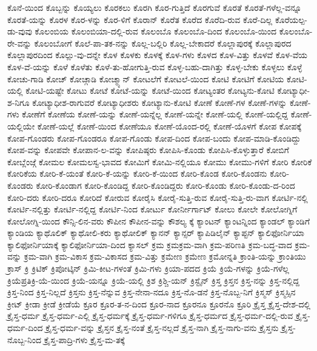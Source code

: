 {ಕೊನೆ-ಯಿಂದ
ಕೊಬ್ಬನ್ನು
ಕೊಯ್ಯಲು
ಕೊರಕಲು
ಕೊರಗಿ
ಕೊರ-ಗುತ್ತಿದೆ
ಕೊರಗುವೆ
ಕೊರತೆ
ಕೊರತೆ-ಗಳೆಲ್ಲ-ವನ್ನೂ
ಕೊರತೆ-ಯನ್ನು
ಕೊರಳ
ಕೊರ-ಳನ್ನು
ಕೊರ-ಳಿಗೆ
ಕೊರಾನ್
ಕೊರೆತ
ಕೊರೆದ
ಕೊರೆದಿ-ರುವ
ಕೊರೆ-ದಿಲ್ಲ
ಕೊರೆಯಲ್ಪ-ಡು-ವುವು
ಕೊಲಂಬಿಯ
ಕೊಲಂಬಿಯಾ-ದಲ್ಲಿ-ರುವ
ಕೊಲಂಬೊ
ಕೊಲಂಬೊ-ದಿಂದ
ಕೊಲಂಬೊ-ಯಿಂದ
ಕೊಲಂಬೊ-ರೇ-ವನ್ನು
ಕೊಲಂಬೋಗೆ
ಕೊಲೆ-ಪಾ-ತಕ-ನನ್ನು
ಕೊಲ್ಲ-ಬಲ್ಲಿರಿ
ಕೊಲ್ಲ-ಬೇಕಾದರೆ
ಕೊಲ್ಲಾಪುರಕ್ಕೆ
ಕೊಲ್ಲಾಪುರದ
ಕೊಲ್ಲಾಪುರದಿಂದ
ಕೊಲ್ಲು-ವು-ದನ್ನೇ
ಕೊಳ
ಕೊಳಕು
ಕೊಳಕ್ಕೆ
ಕೊಳ-ಗಳು
ಕೊಳದ
ಕೊಳ-ವಿತ್ತು
ಕೊಳವೆ
ಕೊಳ-ವೆಯ
ಕೊಳ-ವೆ-ಯನ್ನು
ಕೊಳೆ
ಕೊಳೆತು
ಕೊಳೆ-ತು-ಹೋಗುತ್ತಿ-ರುವ
ಕೊಳ್ಳ-ಬಹು-ದಾಗಿತ್ತು
ಕೊಳ್ಳ-ಬೇಕು
ಕೊಳ್ಳಲು
ಕೊಳ್ಳೆ
ಕೋಚು-ಗಾಡಿ
ಕೋಚ್
ಕೋಚ್ಗಾಡಿ
ಕೋಚ್ಮ್ಯಾನ್
ಕೋಟಲೆಗೆ
ಕೋಟಲೆ-ಯಿಂದ
ಕೋಟಿ
ಕೋಟಿಗೆ
ಕೋಟಿಯ
ಕೋಟಿ-ಯಲ್ಲಿ
ಕೋಟಿ-ಯಷ್ಟೇ
ಕೋಟು
ಕೋಟೆ
ಕೋಟೆ-ಯನ್ನು
ಕೋಟೆ-ಯಿಂದ
ಕೋಟ್ಯಂತರ
ಕೋಟ್ಯನು-ಕೋಟಿ
ಕೋಟ್ಯಾಧೀ-ಶ-ನಿಗೂ
ಕೋಟ್ಯಾಧೀಶ-ರಾಗುವರೆ
ಕೋಟ್ಯಾಧೀಶರು
ಕೋಟ್ಯಾನು-ಕೋಟಿ
ಕೋಣೆ
ಕೋಣೆ-ಗಳ
ಕೋಣೆ-ಗಳನ್ನು
ಕೋಣೆ-ಗಳು
ಕೋಣೆಗೆ
ಕೋಣೆಯ
ಕೋಣೆ-ಯನ್ನು
ಕೋಣೆ-ಯನ್ನೆಲ್ಲ
ಕೋಣೆ-ಯನ್ನೇ
ಕೋಣೆ-ಯಲ್ಲಿ
ಕೋಣೆ-ಯಲ್ಲಿದ್ದ
ಕೋಣೆ-ಯಲ್ಲಿಯೇ
ಕೋಣೆ-ಯಲ್ಲೆ
ಕೋಣೆ-ಯಿಂದ
ಕೋಣೆಯೂ
ಕೋಣೆ-ಯೊಂದ-ರಲ್ಲಿ
ಕೋಣೆ-ಯೊಳಗೆ
ಕೋಪ
ಕೋಪಕ್ಕೆ
ಕೋಪ-ಗೊಂಡರು
ಕೋಪ-ಗೊಂಡರೂ
ಕೋಪ-ಗೊಂಡು
ಕೋಪ-ದಿಂದ
ಕೋಪ-ಬಂದು
ಕೋಪ-ಮಾಡಿ-ಕೊಂಡಿದ್ದು
ಕೋಪ-ವನ್ನು
ಕೋಪವೇ
ಕೋಪಾನ-ಲ-ವನ್ನು
ಕೋಪಿಷ್ಠರು
ಕೋಪಿಸಿ-ಕೊಂಡು
ಕೋಪಿಸಿ-ಕೊಳ್ಳುತ್ತಾರೆ
ಕೋಬಿಗೆ
ಕೋಬ್ಲೆಂಜ್ಗೆ
ಕೋಮಲ
ಕೋಮಲಸ್ವ-ಭಾವದ
ಕೋಮಿಗೆ
ಕೋಮಿ-ನಲ್ಲಿಯೂ
ಕೋಮು
ಕೋಮು-ಗಳಿಗೆ
ಕೋರಿ
ಕೋರಿಕೆ
ಕೋರಿಕೆಯ
ಕೋರಿ-ಕೆ-ಯಂತೆ
ಕೋರಿ-ಕೆ-ಯನ್ನು
ಕೋರಿ-ಕೆ-ಯಿಂದ
ಕೋರಿ-ಕೊಂಡ
ಕೋರಿ-ಕೊಂಡನು
ಕೋರಿ-ಕೊಂಡರು
ಕೋರಿ-ಕೊಂಡಾಗ
ಕೋರಿ-ಕೊಂಡಿದ್ದ
ಕೋರಿ-ಕೊಂಡಿದ್ದರು
ಕೋರಿ-ಕೊಂಡು
ಕೋರಿ-ಕೊಂಡು-ದ-ರಿಂದ
ಕೋರಿ-ದರು
ಕೋರಿ-ದರೂ
ಕೋರಿದೆ
ಕೋರುವ
ಕೋರೈಸಿ
ಕೋರೈ-ಸುತ್ತಿ-ರುವ
ಕೋರೈ-ಸುತ್ತಿ-ರು-ವಾಗ
ಕೋರ್ಟಿ-ನಲ್ಲಿ
ಕೋರ್ಟಿ-ನಲ್ಲಿತ್ತು
ಕೋರ್ಟಿ-ನಲ್ಲಿದ್ದ
ಕೋರ್ಟಿ-ನಿಂದ
ಕೋರ್ಟು
ಕೋರ್ನೀರ್ಗಾಟ್
ಕೋಲು
ಕೋಲೇ
ಕೋಲೋಗ್ನಿಗೆ
ಕೋಲೋಗ್ನಿ-ಯಿಂದ
ಕೌನ್ಸಿ-ಲಿನ-ವರು
ಕೌಪೀನ
ಕೌಪೀನ-ವನ್ನು
ಕೌಶಲ್ಯ
ಕ್ಕೆ
ಕ್ಯಾಂಟನ್
ಕ್ಯಾಂಟನ್ನಿಂದ
ಕ್ಯಾಂಡಲ್
ಕ್ಯಾಂಡಿಗೆ
ಕ್ಯಾಂಡಿಯ
ಕ್ಯಾಥೊಲಿಕ್
ಕ್ಯಾಥೋಲಿ-ಕರು
ಕ್ಯಾಥೋಲಿಕ್
ಕ್ಯಾನನ್
ಕ್ಯಾನ್ಸರ್
ಕ್ಯಾಪಿಡಿಲೈನ್
ಕ್ಯಾಪ್ಟನ್
ಕ್ಯಾಲಿಫೋರ್ನಿಯಾ
ಕ್ಯಾಲಿಫೋರ್ನಿಯಾಕ್ಕೆ
ಕ್ಯಾಲಿಫೋರ್ನಿಯಾ-ದಿಂದ
ಕ್ಯಾಸಲ್
ಕ್ರಮ
ಕ್ರಮಕ್ರಮ-ವಾಗಿ
ಕ್ರಮ-ಪರಿಣತಿ
ಕ್ರಮ-ಬದ್ಧ-ವಾದ
ಕ್ರಮ-ವನ್ನು
ಕ್ರಮ-ವಾಗಿ
ಕ್ರಮ-ವಿಕಾಸ
ಕ್ರಮ-ವಿಕಾಸದ
ಕ್ರಮ-ವಿತ್ತು
ಕ್ರಮೇಣ
ಕ್ರಮೇಣ
ಕ್ರಮೋನ್ನತಿ
ಕ್ರಾಂತಿ-ಯನ್ನು
ಕ್ರಾಂತಿಯು
ಕ್ರಾಸ್
ಕ್ರಿ
ಕ್ರಿಟಿಕ್
ಕ್ರಿಪೋಟ್ಕಿನ್
ಕ್ರಿಮಿ-ಕೀಟ-ಗಳಂತೆ
ಕ್ರಿಮಿ-ಗಳು
ಕ್ರಿಯಾ-ಪದದ
ಕ್ರಿಯೆ
ಕ್ರಿಯೆ-ಗಳನ್ನು
ಕ್ರಿಯೆ-ಗಳೆಲ್ಲ
ಕ್ರಿಯೆಪ್ರತಿಕ್ರಿ-ಯೆ-ಯಿಂದ
ಕ್ರಿಯೆ-ಯನ್ನೂ
ಕ್ರಿಯೆ-ಯಲ್ಲಿ
ಕ್ರಿಶ
ಕ್ರಿಶ್ಚಿ-ಯನ್
ಕ್ರಿಸ್ಟೈನ್
ಕ್ರಿಸ್ತ
ಕ್ರಿಸ್ತನ
ಕ್ರಿಸ್ತ-ನನ್ನು
ಕ್ರಿಸ್ತ-ನಲ್ಲಿದ್ದ
ಕ್ರಿಸ್ತ-ನಿಂದ
ಕ್ರಿಸ್ತ-ನಿಲ್ಲದೆ
ಕ್ರಿಸ್ತನು
ಕ್ರಿಸ್ತ-ನೆನ್ನುವ
ಕ್ರಿಸ್ತ-ನೇನಾ-ನದೂ
ಕ್ರಿಸ್ತ-ನೊ-ಡನೆ
ಕ್ರಿಸ್ತ-ನೊಬ್ಬ-ನಿಗೆ
ಕ್ರಿಸ್ಮಸ್
ಕ್ರಿಸ್ಮಸ್ಸಿನ
ಕ್ರೀಟ್
ಕ್ರೀಡಾ
ಕ್ರೀಡೆ
ಕ್ರೀಡೆಯೆ
ಕ್ರೂರ
ಕ್ರೂರ-ತ-ನ-ದಿಂದ
ಕ್ರೂರ-ನಾದ
ಕ್ರೂರನೂ
ಕ್ರೂರನೊ
ಕ್ರೂರಿ
ಕ್ರೈಸ್ತ
ಕ್ರೈಸ್ತ-ದೇಶ-ದಲ್ಲಿ
ಕ್ರೈಸ್ತ-ಧರ್ಮ
ಕ್ರೈಸ್ತ-ಧರ್ಮ-ಎಲ್ಲಿ
ಕ್ರೈಸ್ತ-ಧರ್ಮಕ್ಕೆ
ಕ್ರೈಸ್ತ-ಧರ್ಮ-ಗಳಿಗೂ
ಕ್ರೈಸ್ತ-ಧರ್ಮದ
ಕ್ರೈಸ್ತ-ಧರ್ಮ-ದಲ್ಲಿ-ರುವ
ಕ್ರೈಸ್ತ-ಧರ್ಮ-ದಿಂದ
ಕ್ರೈಸ್ತ-ಧರ್ಮ-ವನ್ನು
ಕ್ರೈಸ್ತನ
ಕ್ರೈಸ್ತ-ನಂತೆ
ಕ್ರೈಸ್ತ-ನಲ್ಲದೆ
ಕ್ರೈಸ್ತ-ನಾಗಿ
ಕ್ರೈಸ್ತ-ನಾಗು-ವನು
ಕ್ರೈಸ್ತನು
ಕ್ರೈಸ್ತ-ನೊಬ್ಬ-ನಿಂದ
ಕ್ರೈಸ್ತ-ಪಾದ್ರಿ-ಗಳು
ಕ್ರೈಸ್ತ-ಮ-ತಕ್ಕೆ
}

